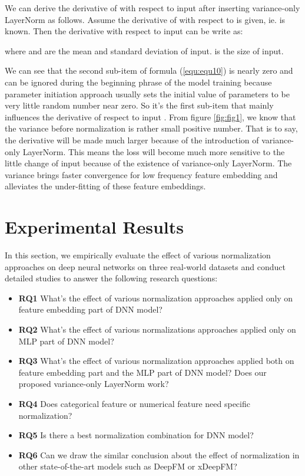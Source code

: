 \documentclass[sigconf]{acmart}
\begin{document}
We can derive the derivative of  with respect to input  after inserting variance-only LayerNorm as follows. Assume the derivative of  with respect to  is given, ie.  is known. Then the derivative with respect to input  can be write as:




where  and  are the mean and standard deviation of input.  is the size of input.

We can see that the second sub-item of formula (\ref{equ:equ10}) is nearly zero and can be ignored during the beginning phrase of the model training because parameter initiation approach usually sets the initial value of parameters to be very little random number near zero. So it's the first sub-item that mainly influences the derivative of  respect to input . From figure \ref{fig:fig1}, we know that the variance before normalization is rather small positive number. That is to say, the derivative will be made much larger because of the introduction of variance-only LayerNorm. This means the loss will become much more sensitive to the little change of input  because of the existence of variance-only LayerNorm.  The variance brings faster convergence for low frequency feature embedding and alleviates the under-fitting of these feature embeddings.





\section{Experimental Results}
In this section, we empirically evaluate the effect of various normalization approaches on deep neural networks on three real-world datasets and conduct detailed studies to answer the following research questions:

\begin{itemize}

\item\noindent\textbf{RQ1} What's the effect of various normalization approaches applied only on feature embedding part of DNN model?

\item\noindent\textbf{RQ2} What's the effect of various normalizations approaches   applied only on MLP part of DNN model?

\item\noindent\textbf{RQ3} What's the effect of various normalization approaches   applied both on feature embedding part and the MLP part of DNN model? Does our proposed variance-only LayerNorm  work?

\item\noindent\textbf{RQ4} Does categorical feature or numerical feature need specific normalization?

\item\noindent\textbf{RQ5} Is there a best normalization combination for DNN model?


\item\noindent\textbf{RQ6} Can we draw the similar conclusion about the effect of normalization in other state-of-the-art models such as DeepFM or xDeepFM?

\end{itemize}
\end{document}
